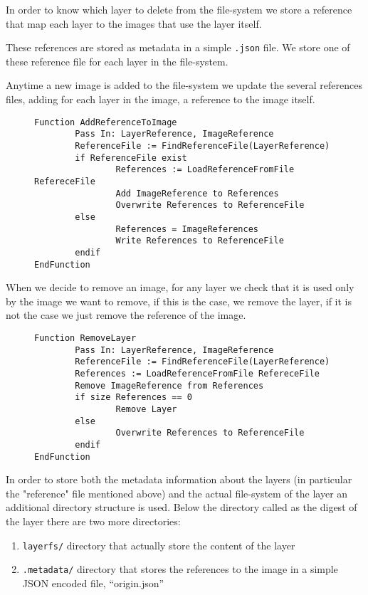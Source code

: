 In order to know which layer to delete from the file-system we store a reference
that map each layer to the images that use the layer itself.

These references are stored as metadata in a simple \texttt{.json} file.  We
store one of these reference file for each layer in the file-system.

Anytime a new image is added to the file-system we update the several
references files, adding for each layer in the image, a reference to the image
itself.

\begin{figure}
\begin{lstlisting}[caption={Algorithm to add an image reference to the layer metadata}, label={lst:add-image-reference-to-layer}]
Function AddReferenceToImage
        Pass In: LayerReference, ImageReference
        ReferenceFile := FindReferenceFile(LayerReference)
        if ReferenceFile exist
                References := LoadReferenceFromFile RefereceFile
                Add ImageReference to References
                Overwrite References to ReferenceFile
        else 
                References = ImageReferences
                Write References to ReferenceFile
        endif
EndFunction
\end{lstlisting}
\end{figure}

When we decide to remove an image, for any layer we check that it is used only
by the image we want to remove, if this is the case, we remove the layer, if it
is not the case we just remove the reference of the image.

\begin{figure}
\begin{lstlisting}[caption={Algorithm to remove an image from the file-system}, label={lst:remove-layer}]
Function RemoveLayer
        Pass In: LayerReference, ImageReference
        ReferenceFile := FindReferenceFile(LayerReference)
        References := LoadReferenceFromFile RefereceFile
        Remove ImageReference from References
        if size References == 0
                Remove Layer
        else
                Overwrite References to ReferenceFile
        endif
EndFunction
\end{lstlisting}
\end{figure}

In order to store both the metadata information about the layers (in particular
the "reference" file mentioned above) and the actual file-system of the layer
an additional directory structure is used. Below the directory called as the
digest of the layer there are two more directories: 
\begin{enumerate} 
        \item \texttt{layerfs/} directory that actually store the content of the layer
        \item \texttt{.metadata/} directory that stores the references to the image in a simple JSON encoded file, “origin.json”
\end{enumerate}

